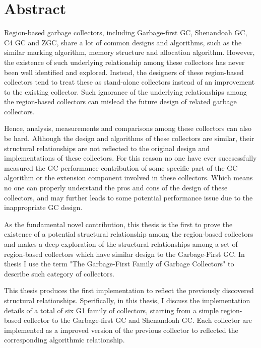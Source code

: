 \chapter*{Abstract}
\vspace{-1em}


Region-based garbage collectors, including Garbage-first GC, Shenandoah GC, C4 GC and ZGC,
share a lot of common designs and algorithms, such as
the similar marking algorithm, memory structure and allocation algorithm.
However, the existence of such underlying relationship among these collectors
has never been well identified and explored.
Instead, the designers of these region-based collectors tend to treat these as
stand-alone collectors instead of an improvement to the existing collector.
Such ignorance of the underlying relationships among the region-based collectors
can mislead the future design of related garbage collectors. 

Hence, analysis, measurements and comparisons among these collectors can also be hard.
Although the design and algorithms of these collectors are similar,
their structural relationships are not reflected to the
original design and implementations of these collectors.
For this reason no one have ever succsessfully measured
the GC performance contribution of some specific part of the GC algorithm or the extension component involved
in these collectors.
Which means no one can properly understand the pros and cons
of the design of these collectors, and may further leads to some potential performance
issue due to the inappropriate GC design.


As the fundamental novel contribution, this thesis is the first to prove the existence of a potential
structural relationship among the region-based collectors and makes a deep exploration
of the structural relationships among a set of region-based collectors which have similar
design to the Garbage-First GC. In thesis I use the term
"The Garbage-First Family of Garbage Collectors" to describe such category of collectors.

This thesis produces the first implementation to reflect the previously
discovered structural relationships.
Sperifically, in this thesis, I discuss the implementation details of a total of six G1 family
of collectors, starting from a simple region-based
collector to the Garbage-first GC and Shenandoah GC.
Each collector are implemented as a improved version of the previous collector to reflected
the corresponding algorithmic relationship.

